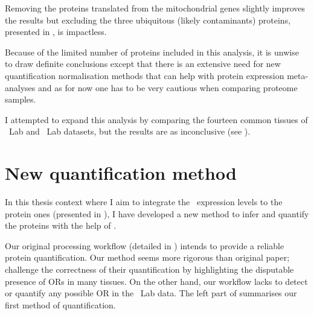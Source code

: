 Removing the proteins translated from the mitochondrial genes slightly
improves the results
but excluding the three ubiquitous (likely contaminants) proteins, presented
in ,
is impactless.\mybr\

Because of the limited number of proteins included in this analysis,
it is unwise to draw definite conclusions
except that there is an extensive need for new quantification normalisation methods
that can help with protein expression meta-analyses
and as for now one has to be very cautious when comparing proteome samples.\mybr\

I attempted to expand this analysis by comparing the fourteen common tissues
of \pandey\ Lab and \kuster\ Lab datasets,
but the results are as inconclusive
(see ).\mybr\

\section{New quantification method}\label{sec:NewQuantProt}

In this thesis context where I aim to integrate
the \mRNA\ expression levels to the protein ones
(presented in ),
I have developed a new method to infer and quantify the proteins
with the help of \james.\mybr\

Our original processing workflow (detailed in )
intends to provide a reliable protein quantification.
Our method seems more rigorous than \citet{PandeyData} original paper;
\citet{Ezkurdia2014-qx} challenge the correctness of their quantification
by highlighting the disputable presence of \glspl{OR} in many tissues.
On the other hand, our workflow lacks to detect or quantify any possible \gls{OR}
in the \pandey\ Lab data.
The left part of  summarises
our first method of quantification.\mybr\

